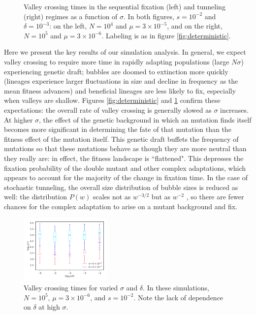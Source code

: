 \documentclass[rmp]{revtex4}
\begin{document}
\begin{spacing}{1.5}
\begin{figure}[t]
\begin{subfigure}[b]{0.4\textwidth}
\end{subfigure}
\caption{Valley crossing times in the sequential fixation (left) and tunneling (right) regimes as a function of $\sigma$. In both figures, $s = 10^{-2}$ and $\delta = 10^{-3}$: on the left, $N = 10^4$ and $\mu = 3\times 10^{-5}$, and on the right, $N = 10^5$ and $\mu = 3\times 10^{-6}$. Labeling is as in figure \ref{fig:deterministic}.}
\label{fig:tunneling}
\end{figure}

Here we present the key results of our simulation analysis.
In general, we expect valley crossing to require more time in rapidly adapting populations (large $N \sigma$) experiencing genetic draft; bubbles are doomed to extinction more quickly (lineages experience larger fluctuations in size and decline in frequency as the mean fitness advances) and beneficial lineages are less likely to fix, especially when valleys are shallow.
Figures \ref{fig:deterministic} and \ref{fig:tunneling} confirm these expectations: the overall rate of valley crossing is generally slowed as $\sigma$ increases.
At higher $\sigma$, the effect of the genetic background in which an mutation finds itself becomes more significant in determining the fate of that mutation than the fitness effect of the mutation itself.
This genetic draft buffets the frequency of mutations so that these mutations behave as though they are more neutral than they really are: in effect, the fitness landscape is ``flattened".
This depresses the fixation probability of the double mutant and other complex adaptations, which appears to account for the majority of the change in fixation time.
In the case of stochastic tunneling, the overall size distribution of bubble sizes is reduced as well: the distribution $P(w)$ scales not as $w^{-3/2}$ but as $w^{-2}$ \citep{neher_shraiman_2011}, so there are fewer chances for the complex adaptation to arise on a mutant background and fix.

\begin{figure}[t]
\includegraphics[width=0.4\textwidth]{Figures/var_sigma_delta.pdf}
\caption{Valley crossing times for varied $\sigma$ and $\delta$. In these simulations, $N = 10^5$, $\mu = 3 \times 10^{-6}$, and $s = 10^{-2}$. Note the lack of dependence on $\delta$ at high $\sigma$.}
\label{fig:sigma_delta}
\end{figure}


\end{spacing}
\end{document}
